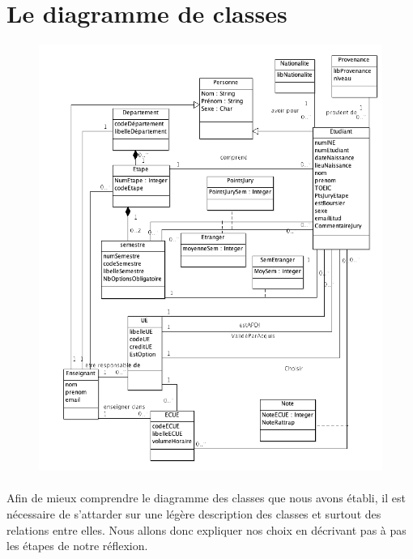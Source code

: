 \documentclass[letter, 11pt] {article}
\begin{document}
	\tableofcontents
	
	\section{Le diagramme de classes}
	
	\begin{figure}[!h]
		\centering
			\includegraphics[scale = 0.7]{../Diagramme_de_classes/Diagramme_classe.png}
	\end{figure}
	
	\paragraph{ }Afin de mieux comprendre le diagramme des classes que nous avons établi, il est nécessaire de s'attarder sur une légère description des classes et surtout des relations entre elles. Nous allons donc expliquer nos choix en décrivant pas à pas les étapes de notre réflexion.
\end{document}
